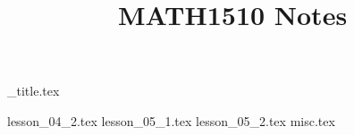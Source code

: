 \documentclass{article}
\title{MATH1510 Notes}
\author{}
\date{}
\begin{document}
{_title.tex}

\tableofcontents

{lesson_04_2.tex}
{lesson_05_1.tex}
{lesson_05_2.tex}
{misc.tex}
\end{document}
